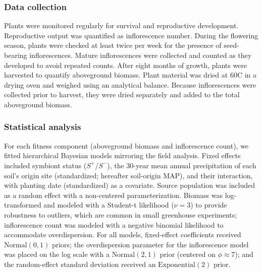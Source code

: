 \documentclass[12pt]{article}\usepackage[]{graphicx}\usepackage[dvipsnames]{xcolor}
\begin{document}
\subsubsection {Data collection}

Plants were monitored regularly for survival and reproductive development. 
Reproductive output was quantified as inflorescence number.
During the flowering season, plants were checked at least twice per week for the presence of seed-bearing inflorescences. 
Mature inflorescences were collected and counted as they developed to avoid repeated counts. 
After eight months of growth, plants were harvested to quantify aboveground biomass. 
Plant material was dried at 60\textdegree C in a drying oven and weighed using an analytical balance. 
Because inflorescences were collected prior to harvest, they were dried separately and added to the total aboveground biomass.

\subsubsection {Statistical analysis}
{}
\label{sec:greenhouse_models}
For each fitness component (aboveground biomass and inflorescence count), we fitted hierarchical Bayesian models mirroring the field analysis. Fixed effects included symbiont status 
($S^+$/$S^-$), the 30-year mean annual precipitation of each soil's origin site (standardized; hereafter soil-origin MAP), and their interaction, with planting date (standardized) as a covariate. 
Source population was included as a random effect with a non-centered parameterization. 
Biomass was log-transformed and modeled with a Student-t likelihood ($\nu = 3$) to provide robustness to outliers, which are common in small greenhouse experiments; inflorescence count was modeled with a negative binomial likelihood to accommodate overdispersion. 
For all models, fixed-effect coefficients received $\text{Normal}(0, 1)$ priors; the overdispersion parameter for the inflorescence model was placed on the log scale with a $\text{Normal}(2, 1)$ prior (centered on $\phi \approx 7$); and the random-effect standard deviation received an $\text{Exponential}(2)$ prior.
\end{document}
